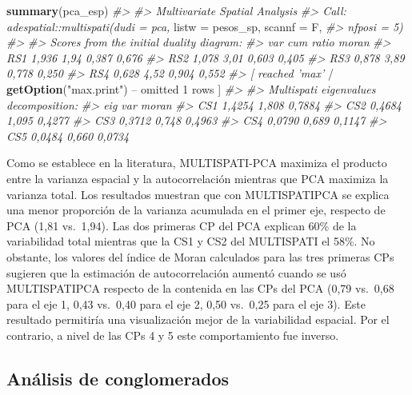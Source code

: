 \documentclass[11pt,b5paper,]{krantz}
\newenvironment{Shaded}{}{}
\newcommand{\CommentTok}[1]{\textcolor[rgb]{0.38,0.63,0.69}{\textit{#1}}}
\newcommand{\DecValTok}[1]{\textcolor[rgb]{0.25,0.63,0.44}{#1}}
\newcommand{\KeywordTok}[1]{\textcolor[rgb]{0.00,0.44,0.13}{\textbf{#1}}}
\newcommand{\NormalTok}[1]{#1}
\newcommand{\OperatorTok}[1]{\textcolor[rgb]{0.40,0.40,0.40}{#1}}
\newcommand{\StringTok}[1]{\textcolor[rgb]{0.25,0.44,0.63}{#1}}
\begin{document}
\begin{Shaded}
\begin{Highlighting}[]
\KeywordTok{summary}\NormalTok{(pca_esp)}
\CommentTok{#>}
\CommentTok{#> Multivariate Spatial Analysis}
\CommentTok{#> Call: adespatial::multispati(dudi = pca,}
\NormalTok{listw =}\StringTok{ }\NormalTok{pesos_sp, scannf =}\StringTok{ }\NormalTok{F,}
\CommentTok{#> nfposi = 5)}
\CommentTok{#>}
\CommentTok{#> Scores from the initial duality diagram:}
\CommentTok{#> var cum ratio moran}
\CommentTok{#> RS1 1,936 1,94 0,387 0,676}
\CommentTok{#> RS2 1,078 3,01 0,603 0,405}
\CommentTok{#> RS3 0,878 3,89 0,778 0,250}
\CommentTok{#> RS4 0,628 4,52 0,904 0,552}
\CommentTok{#> [ reached 'max'}
    \OperatorTok{/}\StringTok{ }\KeywordTok{getOption}\NormalTok{(}\StringTok{"max.print"}\NormalTok{) }\OperatorTok{--}
\NormalTok{omitted }\DecValTok{1}\NormalTok{ rows ]}
\CommentTok{#>}
\CommentTok{#> Multispati eigenvalues decomposition:}
\CommentTok{#> eig var moran}
\CommentTok{#> CS1 1,4254 1,808 0,7884}
\CommentTok{#> CS2 0,4684 1,095 0,4277}
\CommentTok{#> CS3 0,3712 0,748 0,4963}
\CommentTok{#> CS4 0,0790 0,689 0,1147}
\CommentTok{#> CS5 0,0484 0,660 0,0734}
\end{Highlighting}
\end{Shaded}

Como se establece en la literatura, MULTISPATI-PCA maximiza el producto entre la varianza espacial y la autocorrelación mientras que PCA maximiza la varianza total. Los resultados muestran que con MULTISPATIPCA se explica una menor proporción de la varianza acumulada en el primer eje, respecto de PCA (1,81 vs.~1,94). Las dos primeras CP del PCA explican 60\% de la variabilidad total mientras que la CS1 y CS2 del MULTISPATI el 58\%. No obstante, los valores del índice de Moran calculados para las tres primeras CPs sugieren que la estimación de autocorrelación aumentó cuando se usó MULTISPATIPCA respecto de la contenida en las CPs del PCA (0,79 vs.~0,68 para el eje 1, 0,43 vs.~0,40 para el eje 2, 0,50 vs.~0,25 para el eje 3). Este resultado permitiría una visualización mejor de la variabilidad espacial. Por el contrario, a nivel de las CPs 4 y 5 este comportamiento fue inverso.

\hypertarget{anuxe1lisis-de-conglomerados-1}{%
\subsection{Análisis de conglomerados}\label{anuxe1lisis-de-conglomerados-1}}
\end{document}
